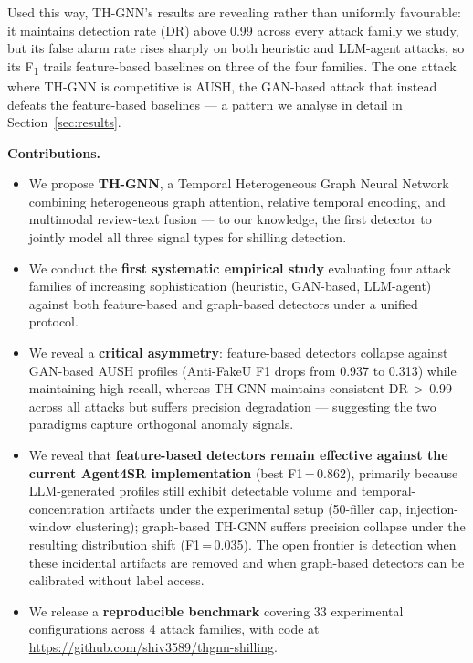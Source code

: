 Used this way, TH-GNN's results are revealing rather than uniformly favourable:
it maintains detection rate (DR) above 0.99 across every attack family we
study, but its false alarm rate rises sharply on both heuristic and
LLM-agent attacks, so its F\textsubscript{1} trails feature-based baselines
on three of the four families. The one attack where TH-GNN is competitive is
AUSH, the GAN-based attack that instead defeats the feature-based baselines —
a pattern we analyse in detail in Section~\ref{sec:results}.

\noindent\textbf{Contributions.}
\begin{itemize}
  \item We propose \textbf{TH-GNN}, a Temporal Heterogeneous Graph Neural Network combining heterogeneous graph attention, relative temporal encoding, and multimodal review-text fusion — to our knowledge, the first detector to jointly model all three signal types for shilling detection.
  \item We conduct the \textbf{first systematic empirical study} evaluating four attack families of increasing sophistication (heuristic, GAN-based, LLM-agent) against both feature-based and graph-based detectors under a unified protocol.
  \item We reveal a \textbf{critical asymmetry}: feature-based detectors collapse against GAN-based AUSH profiles (Anti-FakeU F1 drops from 0.937 to 0.313) while maintaining high recall, whereas TH-GNN maintains consistent DR\,$>$\,0.99 across all attacks but suffers precision degradation — suggesting the two paradigms capture orthogonal anomaly signals.
  \item We reveal that \textbf{feature-based detectors remain effective against the current Agent4SR implementation} (best F1\,=\,0.862), primarily because LLM-generated profiles still exhibit detectable volume and temporal-concentration artifacts under the experimental setup (50-filler cap, injection-window clustering); graph-based TH-GNN suffers precision collapse under the resulting distribution shift (F1\,=\,0.035). The open frontier is detection when these incidental artifacts are removed and when graph-based detectors can be calibrated without label access.
  \item We release a \textbf{reproducible benchmark} covering 33 experimental configurations across 4 attack families, with code at \url{https://github.com/shiv3589/thgnn-shilling}.
\end{itemize}
